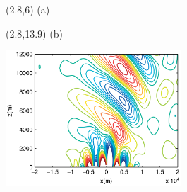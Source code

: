 \documentclass{article}
\begin{document}
\begin{textblock}{0.5}(2.8,6)
\normalsize
(a)
\end{textblock}
\begin{textblock}{0.5}(2.8,13.9)
\normalsize
(b)
\end{textblock}
\footnotesize
\hspace{0.06in}

\includegraphics[height=2in]{img/melvin-7a.png}
\end{document}
